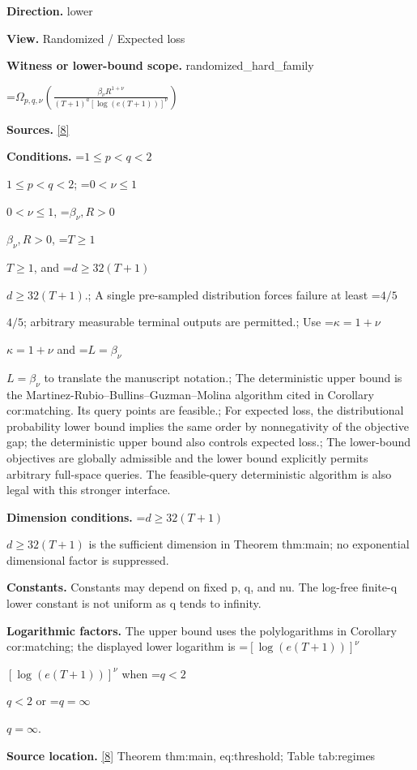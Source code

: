 \documentclass[10pt,a4paper]{article}
\newcommand{\AtlasMath}[1]{\par\begingroup\centering\setbox0=\hbox{$\displaystyle #1$}\ifdim\wd0>1.4\linewidth\typeout{ATLAS WIDE FORMULA: \the\wd0}\fi\ifdim\wd0>\linewidth\resizebox{\linewidth}{!}{\box0}\else\box0\fi\par\endgroup}
\newcommand{\AtlasInlineMath}[1]{\begingroup\setbox0=\hbox{$#1$}\ifdim\wd0>.4\linewidth\endgroup\AtlasMath{#1}\else\endgroup$#1$\fi}
\begin{document}
\textbf{Direction.} lower



\textbf{View.} Randomized / Expected loss



\textbf{Witness or lower-bound scope.} randomized\_hard\_family



\AtlasMath{\Omega_{p,q,\nu}\!\left(\frac{\beta_\nu R^{1+\nu}}{(T+1)^a[\log(e(T+1))]^\nu}\right)}


\textbf{Sources.} \href{https://github.com/WU-Wendao/Colombo/blob/main/colombo_sensorium/Complexity_altas/data/sources/colombo/B1/manuscript.pdf}{[8]}



\textbf{Conditions.} \AtlasInlineMath{1\le p<q<2}; \AtlasInlineMath{0<\nu\le1}, \AtlasInlineMath{\beta_\nu,R>0}, \AtlasInlineMath{T\ge1}, and \AtlasInlineMath{d\ge32(T+1)}.; A single pre-sampled distribution forces failure at least \AtlasInlineMath{4/5}; arbitrary measurable terminal outputs are permitted.; Use \AtlasInlineMath{\kappa=1+\nu} and \AtlasInlineMath{L=\beta_\nu} to translate the manuscript notation.; The deterministic upper bound is the Martinez-Rubio--Bullins--Guzman--Molina algorithm cited in Corollary cor:matching. Its query points are feasible.; For expected loss, the distributional probability lower bound implies the same order by nonnegativity of the objective gap; the deterministic upper bound also controls expected loss.; The lower-bound objectives are globally admissible and the lower bound explicitly permits arbitrary full-space queries. The feasible-query deterministic algorithm is also legal with this stronger interface.



\textbf{Dimension conditions.} \AtlasInlineMath{d\ge32(T+1)} is the sufficient dimension in Theorem thm:main; no exponential dimensional factor is suppressed.



\textbf{Constants.} Constants may depend on fixed p, q, and nu. The log-free finite-q lower constant is not uniform as q tends to infinity.



\textbf{Logarithmic factors.} The upper bound uses the polylogarithms in Corollary cor:matching; the displayed lower logarithm is \AtlasInlineMath{[\log(e(T+1))]^\nu} when \AtlasInlineMath{q<2} or \AtlasInlineMath{q=\infty}.



\textbf{Source location.} \href{https://github.com/WU-Wendao/Colombo/blob/main/colombo_sensorium/Complexity_altas/data/sources/colombo/B1/manuscript.pdf}{[8]} Theorem thm:main, eq:threshold; Table tab:regimes
\end{document}
